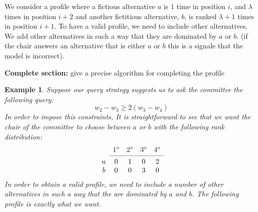 \documentclass[12pt]{article}
\newtheorem{example}{Example}
\begin{document}
We consider a profile where a fictious alternative $a$ is $1$ time in position $i$, and $\lambda$ times 
in position $i+2$ and another fictitious alternative, $b$, is ranked $\lambda+1$ times in position $i+1$.
To have a valid profile, we need to include other alternatives.
We add other alternatives in such a way that they are dominated by $a$ or $b$. 
(if the chair answers an alternative that is either $a$ or $b$ this is a signale that the model is incorrect).

\vspace{1cm}
{\bf Complete section:} give a precise algorithm for completing the profile
\vspace{1cm}

\begin{example}
Suppose our query strategy suggests us to ask the committee the following query:
\[ w_{2} - w_{3} \geq 2(w_{3} - w_{4}) \]
In order to impose this constraints,
It is straightforward to see that we want the  chair of the committee to choose between $a$ or $b$ with the following rank distribution:
\[
\begin{array}{ccccc}
& 1^\circ
& 2^\circ
& 3^\circ
& 4^\circ \\
\cmidrule{2-5}
a & 0& 1& 0& 2 \\
b& 0& 0& 3& 0 \\
\end{array}
\]
In order to obtain a valid profile, we need to include a number of other alternatives in such a way that the are dominated by $a$ and $b$.
The following profile is exactly what we want.


\end{example}
\end{document}

